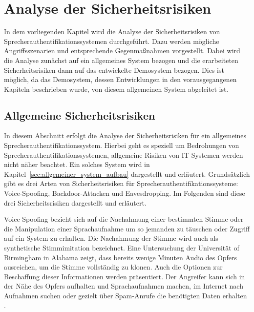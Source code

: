 \section{Analyse der Sicherheitsrisiken}
In dem vorliegenden Kapitel wird die Analyse der Sicherheitsrisiken von Sprecherauthentifikationssystemen durchgeführt.
Dazu werden mögliche Angriffsszenarien und entsprechende Gegenmaßnahmen vorgestellt.
Dabei wird die Analyse zunächst auf ein allgemeines System bezogen und die erarbeiteten Sicherheitsrisiken dann auf das entwickelte Demosystem bezogen.
Dies ist möglich, da das Demosystem, dessen Entwicklungen in den vorausgegangenen Kapiteln beschrieben wurde, von diesem allgemeinen System abgeleitet ist.

\subsection{Allgemeine Sicherheitsrisiken}
In diesem Abschnitt erfolgt die Analyse der Sicherheitsrisiken für ein allgemeines Sprecherauthentifikationssystem.
Hierbei geht es speziell um Bedrohungen von Sprecherauthentifikationssystemen, allgemeine Risiken von IT-Systemen werden nicht näher beachtet.
Ein solches System wird in Kapitel~\ref{sec:allgemeiner_system_aufbau} dargestellt und erläutert.
Grundsätzlich gibt es drei Arten von Sicherheitsrisiken für Sprecherauthentifikationssysteme: Voice-Spoofing, Backdoor-Attacken und Eavesdropping.
Im Folgenden sind diese drei Sicherheitsrisiken dargestellt und erläutert.

Voice Spoofing bezieht sich auf die Nachahmung einer bestimmten Stimme oder die Manipulation einer Sprachaufnahme um so jemanden zu täuschen oder Zugriff auf ein System zu erhalten.
Die Nachahmung der Stimme wird auch als synthetische Stimmimitation bezeichnet.
Eine Untersuchung der Universität of Birmingham in Alabama zeigt, dass bereits wenige Minuten Audio des Opfers ausreichen, um die Stimme vollständig zu klonen.
Auch die Optionen zur Beschaffung dieser Informationen werden präsentiert.
Der Angreifer kann sich in der Nähe des Opfers aufhalten und Sprachaufnahmen machen, im Internet nach Aufnahmen suchen oder gezielt über Spam-Anrufe die benötigten Daten erhalten \autocite[vgl.][]{katherine_shonesy_uab_2015}.

